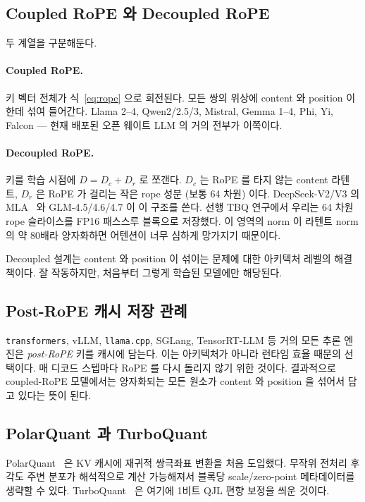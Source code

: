 \documentclass[10pt,twocolumn]{article}
\begin{document}
\subsection{Coupled RoPE 와 Decoupled RoPE}

두 계열을 구분해둔다.

\paragraph{Coupled RoPE.}
키 벡터 전체가 식~\eqref{eq:rope} 으로 회전된다. 모든 쌍의 위상에 content 와 position 이 한데 섞여 들어간다. Llama 2--4, Qwen2/2.5/3, Mistral, Gemma 1--4, Phi, Yi, Falcon --- 현재 배포된 오픈 웨이트 LLM 의 거의 전부가 이쪽이다.

\paragraph{Decoupled RoPE.}
키를 학습 시점에 $D = D_c + D_r$ 로 쪼갠다. $D_c$ 는 RoPE 를 타지 않는 content 라텐트, $D_r$ 은 RoPE 가 걸리는 작은 rope 성분 (보통 64 차원) 이다. DeepSeek-V2/V3 의 MLA~\cite{deepseekv2} 와 GLM-4.5/4.6/4.7 이 이 구조를 쓴다. 선행 TBQ 연구에서 우리는 64 차원 rope 슬라이스를 FP16 패스스루 블록으로 저장했다. 이 영역의 norm 이 라텐트 norm 의 약 80배라 양자화하면 어텐션이 너무 심하게 망가지기 때문이다.

Decoupled 설계는 content 와 position 이 섞이는 문제에 대한 아키텍처 레벨의 해결책이다. 잘 작동하지만, 처음부터 그렇게 학습된 모델에만 해당된다.

\subsection{Post-RoPE 캐시 저장 관례}

\texttt{transformers}, vLLM, \texttt{llama.cpp}, SGLang, TensorRT-LLM 등 거의 모든 추론 엔진은 \emph{post-RoPE} 키를 캐시에 담는다. 이는 아키텍처가 아니라 런타임 효율 때문의 선택이다. 매 디코드 스텝마다 RoPE 를 다시 돌리지 않기 위한 것이다. 결과적으로 coupled-RoPE 모델에서는 양자화되는 모든 원소가 content 와 position 을 섞어서 담고 있다는 뜻이 된다.

\subsection{PolarQuant 과 TurboQuant}

PolarQuant~\cite{polarquant2025} 은 KV 캐시에 재귀적 쌍극좌표 변환을 처음 도입했다. 무작위 전처리 후 각도 주변 분포가 해석적으로 계산 가능해져서 블록당 scale/zero-point 메타데이터를 생략할 수 있다. TurboQuant~\cite{turboquant2026} 은 여기에 1비트 QJL 편향 보정을 씌운 것이다.
\end{document}

